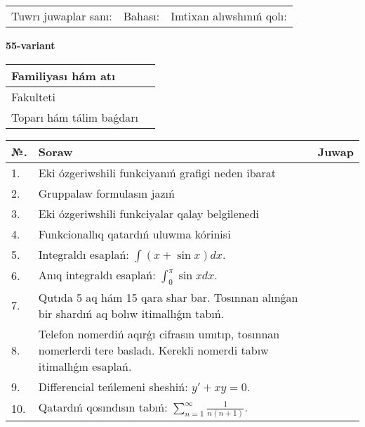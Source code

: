 \documentclass{article}
\begin{document}
\vspace{1cm}

\begin{tabular}{ c c c }
Tuwrı juwaplar sanı: \underline{\hspace{2cm}} & Bahası: \underline{\hspace{2cm}} & Imtixan alıwshınıń qolı: \underline{\hspace{2cm}} \\
\end{tabular}

\newpage

\begin{center}\textbf{55-variant}\end{center}

\bgroup
\def\arraystretch{1.5}
\begin{tabular}{ |m{6cm}|m{10cm}| }
  \hline
  Familiyası hám atı & \\
  \hline
  Fakulteti &\\
  \hline
  Toparı hám tálim baǵdarı & \\
  \hline
\end{tabular}
\egroup

\vspace{0.5cm}

\bgroup
\def\arraystretch{2}
\begin{tabular}{ |l|m{8cm}|m{7cm}| }
  \hline
  №. & Soraw & Juwap \\
  \hline
  1. & Eki ózgeriwshili funkciyanıń grafigi neden ibarat &  \\
  \hline
  2. & Gruppalaw formulasın jazıń &  \\
  \hline
  3. & Eki ózgeriwshili funkciyalar qalay belgilenedi &  \\
  \hline
  4. & Funkcionallıq qatardıń uluwma kórinisi &  \\
  \hline
  5. & Integraldı esaplań: $\displaystyle\int (x + \sin x)dx$. &  \\
  \hline
  6. & Anıq integraldı esaplań: $\displaystyle\int_{0}^{\pi}\sin xdx$. &  \\
  \hline
  7. & Qutıda 5 aq hám 15 qara shar bar. Tosınnan alınǵan bir shardıń aq bolıw itimallıǵın tabıń. &  \\
  \hline
  8. & Telefon nomerdiń aqırǵı cifrasın umıtıp, tosınnan nomerlerdi tere basladı. Kerekli nomerdi tabıw itimallıǵın esaplań. &  \\
  \hline
  9. & Differencial teńlemeni sheshiń: $y' + xy = 0$. &  \\
  \hline
  10. & Qatardıń qosındısın tabıń: $\displaystyle\sum_{n = 1}^{\infty}\frac{1}{n(n + 1)}$. &  \\
  \hline
\end{tabular}
\egroup
\end{document}
